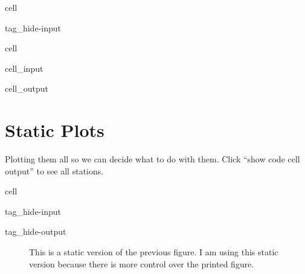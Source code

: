 \documentclass[letterpaper,10pt,english]{jupyterBook}
\begin{document}
\begin{sphinxuseclass}{cell}
\begin{sphinxuseclass}{tag_hide-input}
\end{sphinxuseclass}
\end{sphinxuseclass}
\begin{sphinxuseclass}{cell}\begin{sphinxVerbatimInput}

\begin{sphinxuseclass}{cell_input}
\begin{sphinxVerbatim}[commandchars=\\\{\}]
          
         
\end{sphinxVerbatim}

\end{sphinxuseclass}\end{sphinxVerbatimInput}
\begin{sphinxVerbatimOutput}

\begin{sphinxuseclass}{cell_output}
\end{sphinxuseclass}\end{sphinxVerbatimOutput}

\end{sphinxuseclass}

\chapter{Static Plots}
\label{\detokenize{notebooks/regional_and_local/SL_Rankings_annual:static-plots}}
\sphinxAtStartPar
Plotting them all so we can decide what to do with them. Click “show code cell output” to see all stations.

\begin{sphinxuseclass}{cell}
\begin{sphinxuseclass}{tag_hide-input}
\begin{sphinxuseclass}{tag_hide-output}
\end{sphinxuseclass}
\end{sphinxuseclass}
\end{sphinxuseclass}
\begin{figure}[htbp]
\centering
\capstart

\noindent{}
\caption{This is a static version of the previous figure. I am using this static version because there is more control over the printed figure.}\label{\detokenize{notebooks/regional_and_local/SL_Rankings_annual:sl-rankings}}\end{figure}
\end{document}
